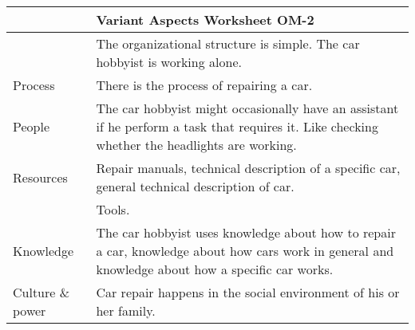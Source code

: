 \noindent
\begin{tabular}%
       {|>{\colleft}p{3cm}%
        |>{\colleft}p{10cm}|}
\hline
{\bf Organization Model} &
   {\bf Variant Aspects Worksheet OM-2} \\
\hline
\hline
{\sc Structure} &
The organizational structure is simple. The car hobbyist is working alone.
\\
\hline
{\sc Process} &
There is the process of repairing a car.
\\
\hline
{\sc People} &
The car hobbyist might occasionally have an assistant if he perform a task that
requires it. Like checking whether the headlights are working.
\\
\hline
{\sc Resources} &
 Repair manuals, technical description of a specific car, general technical
description of car.
 \\
 &
 Tools.
 \\
\hline
{\sc Knowledge} &
The car hobbyist uses knowledge about how to repair a car, knowledge about how
cars work in general and knowledge about how a specific car works. \\
\hline
{Culture \& power} &
Car repair happens in the social environment of his or her family.
\\
\hline
\end{tabular}
